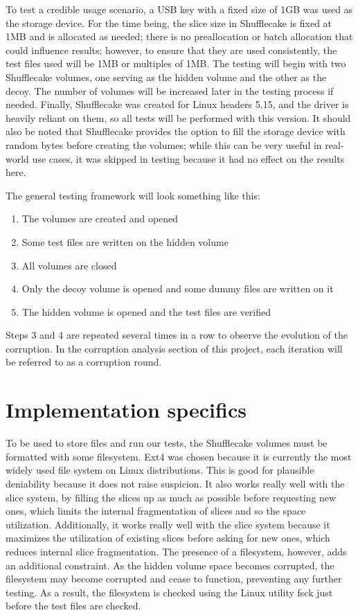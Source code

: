 \documentclass[a4paper,11pt,oneside]{report}
\begin{document}
To test a credible usage scenario, a USB key with a fixed size of 1GB was used as the storage device. For the time being, the slice size in Shufflecake is fixed at 1MB and is allocated as needed; there is no preallocation or batch allocation that could influence results; however, to ensure that they are used consistently, the test files used will be 1MB or multiples of 1MB. The testing will begin with two Shufflecake volumes, one serving as the hidden volume and the other as the decoy. The number of volumes will be increased later in the testing process if needed. Finally, Shufflecake was created for Linux headers 5.15, and the driver is heavily reliant on them, so all tests will be performed with this version. It should also be noted that Shufflecake provides the option to fill the storage device with random bytes before creating the volumes; while this can be very useful in real-world use cases, it was skipped in testing because it had no effect on the results here.

The general testing framework will look something like this:
\begin{enumerate}
    \item The volumes are created and opened
    \item Some test files are written on the hidden volume
    \item All volumes are closed
    \item Only the decoy volume is opened and some dummy files are written on it
    \item The hidden volume is opened and the test files are verified
\end{enumerate}
Steps 3 and 4 are repeated several times in a row to observe the evolution of the corruption. In the corruption analysis section of this project, each iteration will be referred to as a corruption round.

\section{Implementation specifics}

To be used to store files and run our tests, the Shufflecake volumes must be formatted with some filesystem. Ext4\cite{ext4} was chosen because it is currently the most widely used file system on Linux distributions. This is good for plausible deniability because it does not raise suspicion. It also works really well with the slice system, by filling the slices up as much as possible before requesting new ones, which limits the internal fragmentation of slices and so the space utilization. Additionally, it works really well with the slice system because it maximizes the utilization of existing slices before asking for new ones, which reduces internal slice fragmentation\cite{Anzuoni:297353}. The presence of a filesystem, however, adds an additional constraint. As the hidden volume space becomes corrupted, the filesystem may become corrupted and cease to function, preventing any further testing. As a result, the filesystem is checked using the Linux utility fsck just before the test files are checked.
\end{document}
